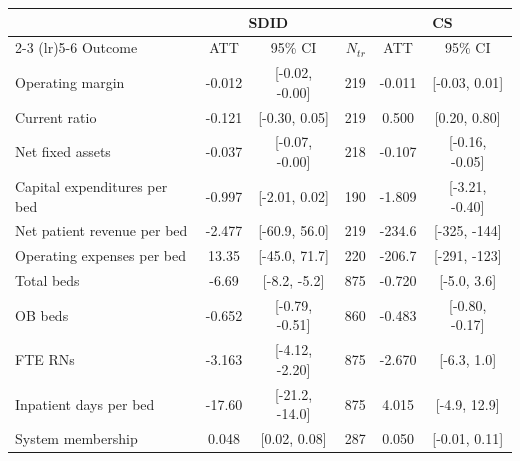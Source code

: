 \begin{tabular}{lccrcc}
\toprule
 & \multicolumn{2}{c}{SDID} & & \multicolumn{2}{c}{CS} \\
\cmidrule(lr){2-3} \cmidrule(lr){5-6}
Outcome & ATT & 95\% CI & $N_{tr}$ & ATT & 95\% CI \\
\midrule
Operating margin & -0.012 & [-0.02, -0.00] & 219 & -0.011 & [-0.03, 0.01] \\
Current ratio & -0.121 & [-0.30, 0.05] & 219 & 0.500 & [0.20, 0.80] \\
Net fixed assets & -0.037 & [-0.07, -0.00] & 218 & -0.107 & [-0.16, -0.05] \\
Capital expenditures per bed & -0.997 & [-2.01, 0.02] & 190 & -1.809 & [-3.21, -0.40] \\
Net patient revenue per bed & -2.477 & [-60.9, 56.0] & 219 & -234.6 & [-325, -144] \\
Operating expenses per bed & 13.35 & [-45.0, 71.7] & 220 & -206.7 & [-291, -123] \\
\addlinespace
Total beds & -6.69 & [-8.2, -5.2] & 875 & -0.720 & [-5.0, 3.6] \\
OB beds & -0.652 & [-0.79, -0.51] & 860 & -0.483 & [-0.80, -0.17] \\
FTE RNs & -3.163 & [-4.12, -2.20] & 875 & -2.670 & [-6.3, 1.0] \\
Inpatient days per bed & -17.60 & [-21.2, -14.0] & 875 & 4.015 & [-4.9, 12.9] \\
\addlinespace
System membership & 0.048 & [0.02, 0.08] & 287 & 0.050 & [-0.01, 0.11] \\
\bottomrule
\end{tabular}
